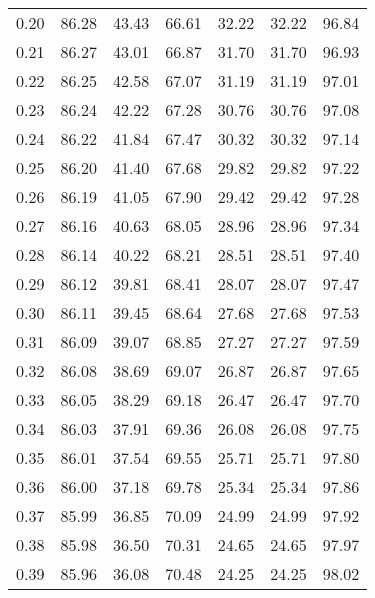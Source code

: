 \begin{tabular}{|c|c|c|c|c|c|c|}
      0.20 &     86.28 &     43.43 &      66.61 &   32.22 &      32.22 &         96.84 \\
      0.21 &     86.27 &     43.01 &      66.87 &   31.70 &      31.70 &         96.93 \\
      0.22 &     86.25 &     42.58 &      67.07 &   31.19 &      31.19 &         97.01 \\
      0.23 &     86.24 &     42.22 &      67.28 &   30.76 &      30.76 &         97.08 \\
      0.24 &     86.22 &     41.84 &      67.47 &   30.32 &      30.32 &         97.14 \\
      0.25 &     86.20 &     41.40 &      67.68 &   29.82 &      29.82 &         97.22 \\
      0.26 &     86.19 &     41.05 &      67.90 &   29.42 &      29.42 &         97.28 \\
      0.27 &     86.16 &     40.63 &      68.05 &   28.96 &      28.96 &         97.34 \\
      0.28 &     86.14 &     40.22 &      68.21 &   28.51 &      28.51 &         97.40 \\
      0.29 &     86.12 &     39.81 &      68.41 &   28.07 &      28.07 &         97.47 \\
      0.30 &     86.11 &     39.45 &      68.64 &   27.68 &      27.68 &         97.53 \\
      0.31 &     86.09 &     39.07 &      68.85 &   27.27 &      27.27 &         97.59 \\
      0.32 &     86.08 &     38.69 &      69.07 &   26.87 &      26.87 &         97.65 \\
      0.33 &     86.05 &     38.29 &      69.18 &   26.47 &      26.47 &         97.70 \\
      0.34 &     86.03 &     37.91 &      69.36 &   26.08 &      26.08 &         97.75 \\
      0.35 &     86.01 &     37.54 &      69.55 &   25.71 &      25.71 &         97.80 \\
      0.36 &     86.00 &     37.18 &      69.78 &   25.34 &      25.34 &         97.86 \\
      0.37 &     85.99 &     36.85 &      70.09 &   24.99 &      24.99 &         97.92 \\
      0.38 &     85.98 &     36.50 &      70.31 &   24.65 &      24.65 &         97.97 \\
      0.39 &     85.96 &     36.08 &      70.48 &   24.25 &      24.25 &         98.02 \\

\end{tabular}
